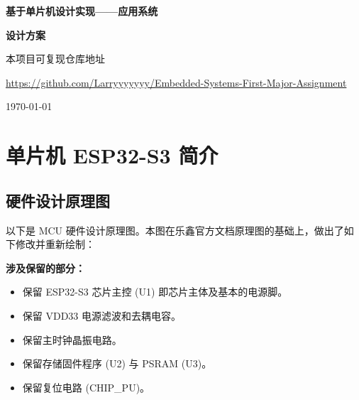 \documentclass[a4paper,12pt]{ctexart}
\newcommand{\docDate}{\today}
\begin{document}
\thispagestyle{empty}
\begin{center}
    \vspace*{2.5cm}

    {\Huge\bfseries 基于单片机设计实现——应用系统}

    \vspace{4cm}

    {\fontsize{36pt}{42pt}\selectfont\bfseries 设计方案}

    \vspace{4cm}

    本项目可复现仓库地址

    \vspace{1cm}

    \href{https://github.com/Larryyyyyyy/Embedded-Systems-First-Major-Assignment}{https://github.com/Larryyyyyyy/Embedded-Systems-First-Major-Assignment}

    \vfill

    {\Large \docDate}

    \vspace{1.5cm}
\end{center}

\newpage


\pagestyle{plain}
\tableofcontents
\newpage

\setcounter{page}{1}


\section{单片机 ESP32-S3 简介}


\subsection{硬件设计原理图}

以下是 MCU 硬件设计原理图。本图在乐鑫官方文档原理图\cite{espressif_esp32s3_hdg}的基础上，做出了如下修改并重新绘制：

\textbf{涉及保留的部分：}

\begin{itemize}
    \item 保留 ESP32-S3 芯片主控 (U1) 即芯片主体及基本的电源脚。
    \item 保留 VDD33 电源滤波和去耦电容。
    \item 保留主时钟晶振电路。
    \item 保留存储固件程序 (U2) 与 PSRAM (U3)。
    \item 保留复位电路 (CHIP\_PU)。
\end{itemize}
\end{document}
